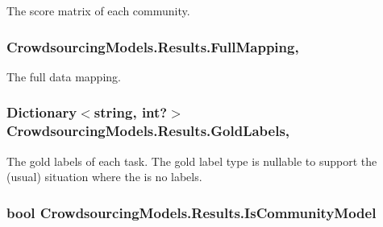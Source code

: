 The score matrix of each community. 

\hypertarget{class_crowdsourcing_models_1_1_results_a8ec786eadd78965d983b08cc44a650dc}{}
\subsubsection[{Full\+Mapping}]{ Crowdsourcing\+Models.\+Results.\+Full\+Mapping\hspace{0.3cm}{\ttfamily [get]}, {\ttfamily [set]}}\label{class_crowdsourcing_models_1_1_results_a8ec786eadd78965d983b08cc44a650dc}


The full data mapping. 

\hypertarget{class_crowdsourcing_models_1_1_results_a25fe8942765452821d24ed2b7fe9a472}{}
\subsubsection[{Gold\+Labels}]{\setlength{\rightskip}{0pt plus 5cm}Dictionary$<$string, int?$>$ Crowdsourcing\+Models.\+Results.\+Gold\+Labels\hspace{0.3cm}{\ttfamily [get]}, {}}\label{class_crowdsourcing_models_1_1_results_a25fe8942765452821d24ed2b7fe9a472}


The gold labels of each task. The gold label type is nullable to support the (usual) situation where the is no labels. 

\hypertarget{class_crowdsourcing_models_1_1_results_a87952670327f4e18a4183dab7238c3d4}{}
\subsubsection[{Is\+Community\+Model}]{\setlength{\rightskip}{0pt plus 5cm}bool Crowdsourcing\+Models.\+Results.\+Is\+Community\+Model\hspace{0.3cm}{\ttfamily [get]}}\label{class_crowdsourcing_models_1_1_results_a87952670327f4e18a4183dab7238c3d4}



